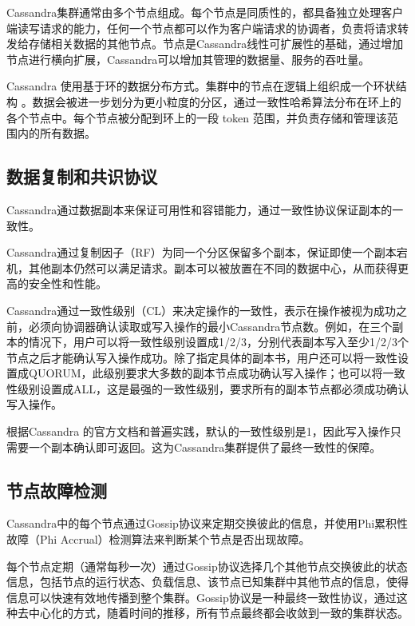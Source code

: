 Cassandra集群通常由多个节点组成。每个节点是同质性的，都具备独立处理客户端读写请求的能力，任何一个节点都可以作为客户端请求的协调者，负责将请求转发给存储相关数据的其他节点。节点是Cassandra线性可扩展性的基础，通过增加节点进行横向扩展，Cassandra可以增加其管理的数据量、服务的吞吐量。

Cassandra 使用基于环的数据分布方式。集群中的节点在逻辑上组织成一个环状结构 。数据会被进一步划分为更小粒度的分区，通过一致性哈希算法\cite{karger1997consistent}分布在环上的各个节点中。每个节点被分配到环上的一段 token 范围，并负责存储和管理该范围内的所有数据。

\subsection{数据复制和共识协议}



Cassandra通过数据副本来保证可用性和容错能力，通过一致性协议保证副本的一致性。

Cassandra通过复制因子（RF）为同一个分区保留多个副本，保证即使一个副本宕机，其他副本仍然可以满足请求。副本可以被放置在不同的数据中心，从而获得更高的安全性和性能。

Cassandra通过一致性级别（CL）来决定操作的一致性，表示在操作被视为成功之前，必须向协调器确认读取或写入操作的最小Cassandra节点数。例如，在三个副本的情况下，用户可以将一致性级别设置成1/2/3，分别代表副本写入至少1/2/3个节点之后才能确认写入操作成功。除了指定具体的副本书，用户还可以将一致性设置成QUORUM，此级别要求大多数的副本节点成功确认写入操作；也可以将一致性级别设置成ALL，这是最强的一致性级别，要求所有的副本节点都必须成功确认写入操作。

根据Cassandra 的官方文档和普遍实践，默认的一致性级别是1，因此写入操作只需要一个副本确认即可返回。这为Cassandra集群提供了最终一致性的保障。

\subsection{节点故障检测}\label{sec:cassandra-failure-detecttion}

Cassandra中的每个节点通过Gossip协议来定期交换彼此的信息，并使用Phi累积性故障（Phi Accrual）检测算法\cite{hayashibara2004spl}来判断某个节点是否出现故障。

每个节点定期（通常每秒一次）通过Gossip协议选择几个其他节点交换彼此的状态信息，包括节点的运行状态、负载信息、该节点已知集群中其他节点的信息，使得信息可以快速有效地传播到整个集群。Gossip协议是一种最终一致性协议，通过这种去中心化的方式，随着时间的推移，所有节点最终都会收敛到一致的集群状态。

